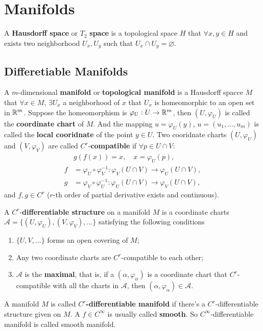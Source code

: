 \section{Manifolds}

\begin{definition}
A \textbf{Hausdorff space} or $T_2$ \textbf{space} is a topological space $H$ that $\forall x,y\in H$ and exists two neighborhood $U_x,U_y$ such that $U_x\cap U_y=\varnothing$.
\end{definition} 

\subsection{Differetiable Manifolds}
\begin{definition}
A $m$-dimensional \textbf{manifold} or \textbf{topological manifold} is a Hausdorff spacce $M$ that $\forall x\in M$, $\exists U_x$ a neighborhood of $x$ that $U_x$ is homeomorphic to an open set in $\mathbb{R}^m$. Suppose the homeomorphism is $\varphi_U:U\to\mathbb{R}^m$, then $(U,\varphi_U)$ is called the \textbf{coordinate chart} of $M$. And the mapping $u=\varphi_U(y)$, $u=(u_1,\dots,u_m)$ is called the \textbf{local cooridnate} of the point $y\in U$. Two cooridnate charts $(U,\varphi_U)$ and $(V,\varphi_V)$ are called $C^r$-\textbf{compatible} if $\forall p\in U\cap V$:
\begin{equation}
\begin{aligned}
&g(f(x))=x,\quad x=\varphi_U(p),\\
f&=\varphi_U\circ\varphi_V^{-1}:\varphi_V(U\cap V)\to \varphi_U(U\cap V),\\
g&=\varphi_V\circ\varphi_U^{-1}:\varphi_U(U\cap V)\to \varphi_V(U\cap V),
\end{aligned}
\end{equation}
and $f,g\in C^r$ ($r$-th order of partial derivative exists and continuous). 
\end{definition} 

\begin{definition}
A $C^r$-\textbf{differentiable structure} on a manifold $M$ is a coordinate charts $\mathcal{A}=\{(U,\varphi_U),(V,\varphi_V),\dots\}$ satisfying the following conditions
\begin{enumerate}
\item $\{U,V,\dots\}$ forms an open covering of $M$;
\item Any two coordinate charts are $C^r$-compatible to each other;
\item $\mathcal{A}$ is the \textbf{maximal}, that is, if a $(\alpha,\varphi_\alpha)$ is a coordinate chart that $C^r$-compatible with all the charts in $\mathcal{A}$, then $(\alpha,\varphi_\alpha)\in\mathcal{A}$.
\end{enumerate}
A manifold $M$ is called $C^r$\textbf{-differentiable manifold} if there's a $C^r$-differentiable structure given on $M$. A $f\in C^\infty$ is usually called \textbf{smooth}. So $C^\infty$-differentiable manifold is called smooth manifold.
\end{definition}

